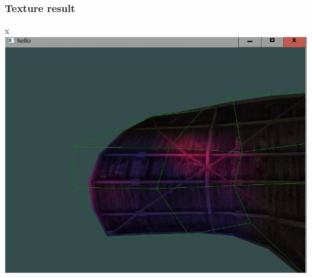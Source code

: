 \documentclass[acmtog]{acmart}
\begin{document}
\subsubsection{Texture result}x\\
\includegraphics[scale=0.5]{3}
\end{document}
